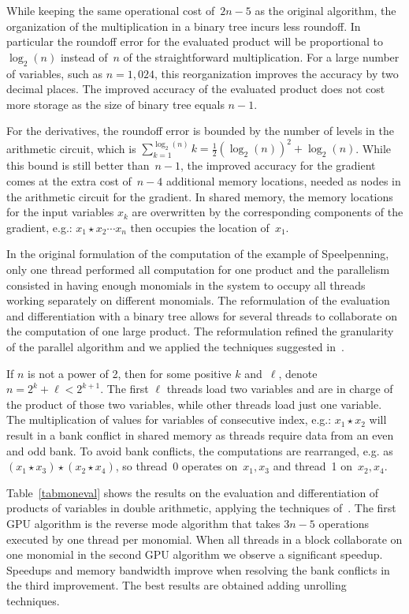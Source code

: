 \documentclass{article}
\begin{document}
While keeping the same operational cost of~$2n - 5$ as the original
algorithm, the organization of the multiplication in a binary tree
incurs less roundoff.  In particular the roundoff error for the
evaluated product will be proportional to $\log_2(n)$ instead of~$n$ 
of the straightforward multiplication.  
For a large number of variables, such as $n = 1,024$,
this reorganization improves the accuracy by two decimal places.
The improved accuracy of the evaluated product does not cost more 
storage as the size of binary tree equals $n-1$.

For the derivatives, the roundoff error is bounded by the number
of levels in the arithmetic circuit, which is
\newline $\displaystyle \sum_{k=1}^{\log_2(n)} k 
= \frac{1}{2} (\log_2(n))^2 + \log_2(n)$.
While this bound is still better than~$n-1$,
the improved accuracy for the gradient comes at the extra cost
of~$n-4$ additional memory locations, needed as nodes in the arithmetic
circuit for the gradient.
In shared memory, the memory locations for the input variables $x_k$
are overwritten by the corresponding components of the gradient,
e.g.: $x_1 \star x_2 \cdots x_n$ 
then occupies the location of~$x_1$. 

In the original formulation of the computation of the example
of Speelpenning, only one thread performed all computation for
one product and the parallelism consisted in having enough
monomials in the system to occupy all threads working separately
on different monomials.  The reformulation of the evaluation
and differentiation with a binary tree allows for several threads
to collaborate on the computation of one large product.
The reformulation refined the granularity of the parallel algorithm
and we applied the techniques suggested in~\cite{Harris}.

If $n$ is not a power of 2, then for some positive $k$ and~$\ell$,
denote $n = 2^k + \ell < 2^{k+1}$.
The first $\ell$ threads load two variables and are in charge of
the product of those two variables, while other threads load
just one variable.  
The multiplication of values for variables of consecutive index,
e.g.: $x_1 \star x_2$ will result in a bank conflict in shared memory
as threads require data from an even and odd bank.
To avoid bank conflicts, the computations are rearranged,
e.g. as $(x_1 \star x_3) \star (x_2 \star x_4)$,
so thread~0 operates on~$x_1, x_3$ and thread~1 on~$x_2, x_4$.

Table~\ref{tabmoneval} shows the results on the evaluation
and differentiation of products of variables in double arithmetic,
applying the techniques of~\cite{Harris}.
The first GPU algorithm is the reverse mode algorithm that takes
$3n - 5$ operations executed by one thread per monomial.
When all threads in a block collaborate on one monomial
in the second GPU algorithm we observe a significant speedup.
Speedups and memory bandwidth improve when resolving the
bank conflicts in the third improvement.
The best results are obtained adding unrolling techniques.
\end{document}
